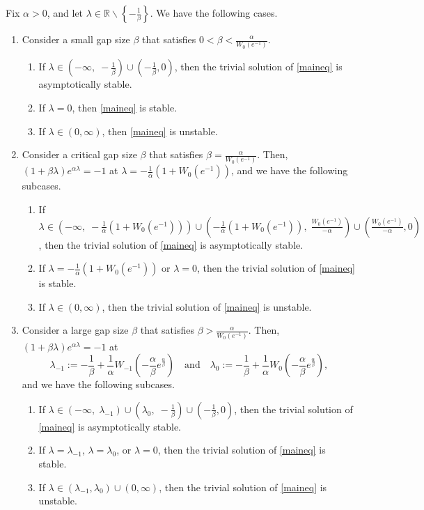 \documentclass[10pt,a4paper]{amsart}
\newcommand{\R}{\ensuremath{\mathbb{R}}}
\begin{document}
\begin{theorem}\label{reallambdathm}
Fix $\alpha>0$, and let $\lambda\in\R\backslash\left\{-\frac{1}{\beta}\right\}$. We have the following cases.
\begin{enumerate}
\item Consider a small gap size $\beta$ that satisfies $0<\beta<\frac{\alpha}{W_0(e^{-1})}$.
 \begin{enumerate}
   \item If $\lambda\in\left(-\infty,\; -\frac{1}{\beta}\right)\cup\left(-\frac{1}{\beta},0\right)$, then the trivial solution of \eqref{maineq} is asymptotically stable. 
   \item If $\lambda=0$, then \eqref{maineq} is stable. 
   \item If $\lambda\in\left(0,\infty\right)$, then \eqref{maineq} is unstable.
 \end{enumerate}
\item Consider a critical gap size $\beta$ that satisfies $\beta=\frac{\alpha}{W_0(e^{-1})}$. Then, $(1+\beta\lambda)e^{\alpha\lambda}=-1$ at $\lambda=-\frac{1}{\alpha}\left(1+W_0(e^{-1})\right)$, and we have the following subcases.
 \begin{enumerate}
   \item If $\lambda\in\left(-\infty,\; -\frac{1}{\alpha}\left(1+W_0(e^{-1})\right)\right)\cup\left(-\frac{1}{\alpha}\left(1+W_0(e^{-1})\right),\; \frac{W_0(e^{-1})}{-\alpha}\right)\cup\left(\frac{W_0(e^{-1})}{-\alpha},0\right)$, 
	       then the trivial solution of \eqref{maineq} is asymptotically stable. 
   \item If $\lambda=-\frac{1}{\alpha}\left(1+W_0(e^{-1})\right)$ or $\lambda=0$, then the trivial solution of \eqref{maineq} is stable.
   \item If $\lambda\in(0,\infty)$, then the trivial solution of \eqref{maineq} is unstable.
 \end{enumerate}
\item Consider a large gap size $\beta$ that satisfies $\beta>\frac{\alpha}{W_0(e^{-1})}$. Then, $(1+\beta\lambda)e^{\alpha\lambda}=-1$ at 
 $$ \lambda_{-1}:=-\frac{1}{\beta}+\frac{1}{\alpha}W_{-1}\left(-\frac{\alpha}{\beta}e^{\frac{\alpha}{\beta}}\right) \quad\text{and}\quad 
    \lambda_{0}:=-\frac{1}{\beta}+\frac{1}{\alpha}W_{0}\left(-\frac{\alpha}{\beta}e^{\frac{\alpha}{\beta}}\right), $$ 
		and we have the following subcases.
 \begin{enumerate}
   \item If $\lambda\in\left(-\infty,\; \lambda_{-1}\right)\cup\left(\lambda_{0},\; -\frac{1}{\beta}\right)\cup\left(-\frac{1}{\beta},0\right)$, then the trivial solution 
	       of \eqref{maineq} is asymptotically stable. 
   \item If $\lambda=\lambda_{-1}$, $\lambda=\lambda_{0}$, or $\lambda=0$, then the trivial solution of \eqref{maineq} is stable.
   \item If $\lambda\in\left(\lambda_{-1},\lambda_{0}\right)\cup(0,\infty)$, 
	       then the trivial solution of \eqref{maineq} is unstable.
 \end{enumerate}
\end{enumerate}
\end{theorem}
\end{document}

